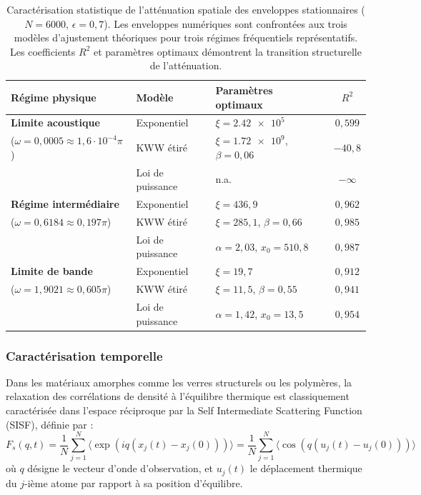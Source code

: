 \begin{table}[htbp]
    \centering
    \small
    \caption{Caractérisation statistique de l'atténuation spatiale des enveloppes stationnaires ($N = 6000$, $\epsilon = 0{,}7$). Les enveloppes numériques sont confrontées aux trois modèles d'ajustement théoriques pour trois régimes fréquentiels représentatifs. Les coefficients $R^2$ et paramètres optimaux démontrent la transition structurelle de l'atténuation.}
    \label{tab:spatial_envelope_fits}
    \begin{tabular}{@{}llp{4.8cm}c@{}}
        \toprule
        \textbf{Régime physique} & \textbf{Modèle} & \textbf{Paramètres optimaux} & \textbf{$R^2$} \\
        \midrule
        \textbf{Limite acoustique} & Exponentiel & $\xi = \num{2.42e5}$ & $0{,}599$ \\
        ($\omega = 0{,}0005 \approx 1{,}6\cdot 10^{-4}\pi$) & KWW étiré & $\xi = \num{1.72e9}$, $\beta = 0{,}06$ & $-40{,}8$ \\
        & Loi de puissance & n.a. & $-\infty$ \\
        \midrule
        \textbf{Régime intermédiaire} & Exponentiel & $\xi = 436{,}9$ & $0{,}962$ \\
        ($\omega = 0{,}6184 \approx 0{,}197\pi$) & KWW étiré & $\xi = 285{,}1$, $\beta = 0{,}66$ & $0{,}985$ \\
        & Loi de puissance & $\alpha = 2{,}03$, $x_0 = 510{,}8$ & $0{,}987$ \\
        \midrule
        \textbf{Limite de bande} & Exponentiel & $\xi = 19{,}7$ & $0{,}912$ \\
        ($\omega = 1{,}9021 \approx 0{,}605\pi$) & KWW étiré & $\xi = 11{,}5$, $\beta = 0{,}55$ & $0{,}941$ \\
        & Loi de puissance & $\alpha = 1{,}42$, $x_0 = 13{,}5$ & $0{,}954$ \\
        \bottomrule
    \end{tabular}
\end{table}

\subsubsection{Caractérisation temporelle}

Dans les matériaux amorphes comme les verres structurels ou les polymères, la relaxation des corrélations de densité à l'équilibre thermique est classiquement caractérisée dans l'espace réciproque par la Self Intermediate Scattering Function (SISF), définie par :
\begin{equation}
    F_s(q, t) = \frac{1}{N} \sum_{j=1}^N \langle \exp\left(i q \left(x_j(t) - x_j(0)\right)\right) \rangle = \frac{1}{N} \sum_{j=1}^N \langle \cos\left(q \left(u_j(t) - u_j(0)\right)\right) \rangle
\end{equation}
où $q$ désigne le vecteur d'onde d'observation, et $u_j(t)$ le déplacement thermique du $j$-ième atome par rapport à sa position d'équilibre. 

